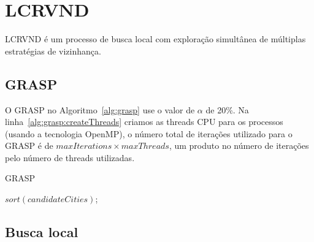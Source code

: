 \section{LCRVND} \label{sec:lcrvnd}

LCRVND é um processo de busca local com exploração simultânea de múltiplas estratégias de vizinhança.

\subsection{GRASP}\label{subsec:lcrvnd_grasp}

O GRASP \cite{feo:1989} no Algoritmo~\ref{alg:grasp} use o valor de $\alpha$ de 20\%.
Na linha~\ref{alg:grasp:createThreads} criamos as threads CPU para os processos (usando a tecnologia OpenMP), o número total de iterações utilizado para o GRASP é de $maxIterations \times maxThreads$, um produto no número de iterações pelo número de threads utilizadas.

\begin{algorithm}[htpb]
\caption{GRASP}
\label{alg:grasp}
\begin{algorithmic}
             \label{alg:grasp:createThreads} 
                    \State $sort(candidateCities)$; 
                     
                \EndFor
                
                     
                \EndFor
                
                \EndIf
            \EndFor
        \EndFor
    \EndFunction
\end{algorithmic}
\end{algorithm}

\subsection{Busca local}\label{subsec:lcrvnd_localSearch}

